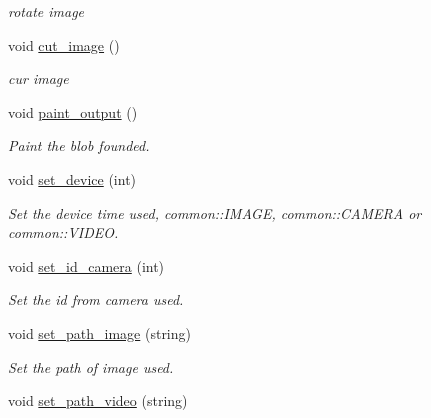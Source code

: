 \begin{DoxyCompactItemize}
\begin{DoxyCompactList}\small\item\em rotate image \end{DoxyCompactList}\item 
void \hyperlink{classcalibration_ab1df3634bf6a485815310d1e2b7aa971}{cut\+\_\+image} ()\hypertarget{classcalibration_ab1df3634bf6a485815310d1e2b7aa971}{}\label{classcalibration_ab1df3634bf6a485815310d1e2b7aa971}

\begin{DoxyCompactList}\small\item\em cur image \end{DoxyCompactList}\item 
void \hyperlink{classcalibration_a9d29a622f2412fcf5cb654444d1bd43e}{paint\+\_\+output} ()
\begin{DoxyCompactList}\small\item\em Paint the blob founded. \end{DoxyCompactList}\item 
void \hyperlink{classcalibration_adba399584f906544ce09309e5539bb84}{set\+\_\+device} (int)\hypertarget{classcalibration_adba399584f906544ce09309e5539bb84}{}\label{classcalibration_adba399584f906544ce09309e5539bb84}

\begin{DoxyCompactList}\small\item\em Set the device time used, common\+::\+I\+M\+A\+GE, common\+::\+C\+A\+M\+E\+RA or common\+::\+V\+I\+D\+EO. \end{DoxyCompactList}\item 
void \hyperlink{classcalibration_aee45977e438474eb1111964a827a8ff9}{set\+\_\+id\+\_\+camera} (int)\hypertarget{classcalibration_aee45977e438474eb1111964a827a8ff9}{}\label{classcalibration_aee45977e438474eb1111964a827a8ff9}

\begin{DoxyCompactList}\small\item\em Set the id from camera used. \end{DoxyCompactList}\item 
void \hyperlink{classcalibration_a2eacc8d2c839f71182d3ec0440056ee7}{set\+\_\+path\+\_\+image} (string)\hypertarget{classcalibration_a2eacc8d2c839f71182d3ec0440056ee7}{}\label{classcalibration_a2eacc8d2c839f71182d3ec0440056ee7}

\begin{DoxyCompactList}\small\item\em Set the path of image used. \end{DoxyCompactList}\item 
void \hyperlink{classcalibration_ac4b64b95163be3bfdfb13c2d23592756}{set\+\_\+path\+\_\+video} (string)\hypertarget{classcalibration_ac4b64b95163be3bfdfb13c2d23592756}{}\label{classcalibration_ac4b64b95163be3bfdfb13c2d23592756}


\end{DoxyCompactItemize}
